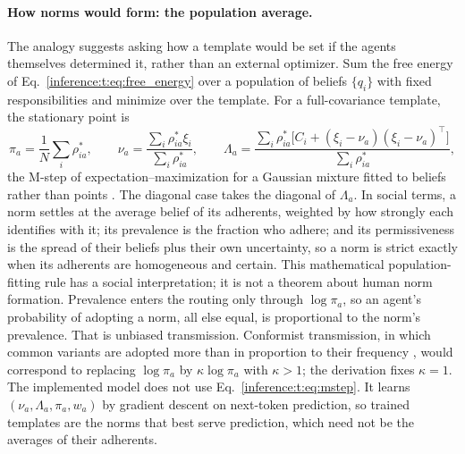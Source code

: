 \documentclass[11pt]{article}
\theoremstyle{definition}
\theoremstyle{remark}
\begin{document}
\paragraph{How norms would form: the population average.}
The analogy suggests asking how a template would be set if the agents themselves determined it, rather than an external optimizer. Sum the free energy of Eq.~\eqref{inference:t:eq:free_energy} over a population of beliefs $\{q_i\}$ with fixed responsibilities and minimize over the template. For a full-covariance template, the stationary point is
\begin{equation}
\pi_a=\frac1N\sum_i\rho^{*}_{ia},
\qquad
\nu_a=\frac{\sum_i\rho^{*}_{ia}\xi_i}{\sum_i\rho^{*}_{ia}},
\qquad
\Lambda_a=\frac{\sum_i\rho^{*}_{ia}\bigl[C_i+(\xi_i-\nu_a)(\xi_i-\nu_a)^{\top}\bigr]}{\sum_i\rho^{*}_{ia}},
\label{inference:t:eq:mstep}
\end{equation}
the M-step of expectation--maximization for a Gaussian mixture fitted to beliefs rather than points \citep{inference:dempster1977}. The diagonal case takes the diagonal of $\Lambda_a$. In social terms, a norm settles at the average belief of its adherents, weighted by how strongly each identifies with it; its prevalence is the fraction who adhere; and its permissiveness is the spread of their beliefs plus their own uncertainty, so a norm is strict exactly when its adherents are homogeneous and certain. This mathematical population-fitting rule has a social interpretation; it is not a theorem about human norm formation. Prevalence enters the routing only through $\log\pi_a$, so an agent's probability of adopting a norm, all else equal, is proportional to the norm's prevalence. That is unbiased transmission. Conformist transmission, in which common variants are adopted more than in proportion to their frequency \citep{inference:henrich1998}, would correspond to replacing $\log\pi_a$ by $\kappa\log\pi_a$ with $\kappa>1$; the derivation fixes $\kappa=1$. The implemented model does not use Eq.~\eqref{inference:t:eq:mstep}. It learns $(\nu_a,\Lambda_a,\pi_a,w_a)$ by gradient descent on next-token prediction, so trained templates are the norms that best serve prediction, which need not be the averages of their adherents.
\end{document}
